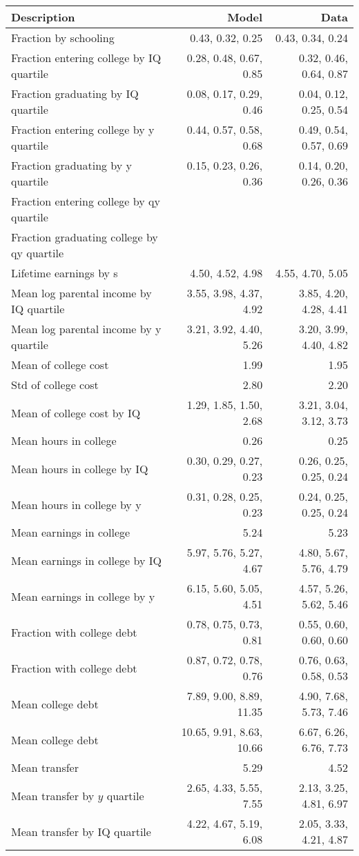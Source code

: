 \begin{tabular}{lrr}
\hline
Description & Model  & Data  \\
\hline
Fraction by schooling & 0.43, 0.32, 0.25  & 0.43, 0.34, 0.24  \\
Fraction entering college by IQ quartile & 0.28, 0.48, 0.67, 0.85  & 0.32, 0.46, 0.64, 0.87  \\
Fraction graduating by IQ quartile & 0.08, 0.17, 0.29, 0.46  & 0.04, 0.12, 0.25, 0.54  \\
Fraction entering college by y quartile & 0.44, 0.57, 0.58, 0.68  & 0.49, 0.54, 0.57, 0.69  \\
Fraction graduating by y quartile & 0.15, 0.23, 0.26, 0.36  & 0.14, 0.20, 0.26, 0.36  \\
Fraction entering college by qy quartile &   &   \\
Fraction graduating college by qy quartile &   &   \\
Lifetime earnings by s & 4.50, 4.52, 4.98  & 4.55, 4.70, 5.05  \\
Mean log parental income by IQ quartile & 3.55, 3.98, 4.37, 4.92  & 3.85, 4.20, 4.28, 4.41  \\
Mean log parental income by y quartile & 3.21, 3.92, 4.40, 5.26  & 3.20, 3.99, 4.40, 4.82  \\
Mean of college cost & 1.99  & 1.95  \\
Std of college cost & 2.80  & 2.20  \\
Mean of college cost by IQ & 1.29, 1.85, 1.50, 2.68  & 3.21, 3.04, 3.12, 3.73  \\
Mean hours in college & 0.26  & 0.25  \\
Mean hours in college by IQ & 0.30, 0.29, 0.27, 0.23  & 0.26, 0.25, 0.25, 0.24  \\
Mean hours in college by y & 0.31, 0.28, 0.25, 0.23  & 0.24, 0.25, 0.25, 0.24  \\
Mean earnings in college & 5.24  & 5.23  \\
Mean earnings in college by IQ & 5.97, 5.76, 5.27, 4.67  & 4.80, 5.67, 5.76, 4.79  \\
Mean earnings in college by y & 6.15, 5.60, 5.05, 4.51  & 4.57, 5.26, 5.62, 5.46  \\
Fraction with college debt & 0.78, 0.75, 0.73, 0.81  & 0.55, 0.60, 0.60, 0.60  \\
Fraction with college debt & 0.87, 0.72, 0.78, 0.76  & 0.76, 0.63, 0.58, 0.53  \\
Mean college debt & 7.89, 9.00, 8.89, 11.35  & 4.90, 7.68, 5.73, 7.46  \\
Mean college debt & 10.65, 9.91, 8.63, 10.66  & 6.67, 6.26, 6.76, 7.73  \\
Mean transfer & 5.29  & 4.52  \\
Mean transfer by $y$ quartile & 2.65, 4.33, 5.55, 7.55  & 2.13, 3.25, 4.81, 6.97  \\
Mean transfer by IQ quartile & 4.22, 4.67, 5.19, 6.08  & 2.05, 3.33, 4.21, 4.87  \\
\hline
\end{tabular}%
